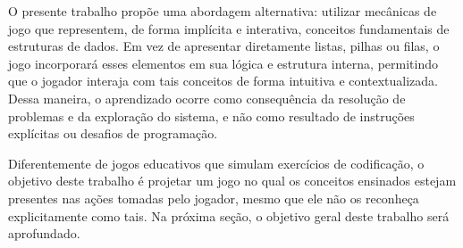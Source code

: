 O presente trabalho propõe uma abordagem alternativa: utilizar mecânicas de
jogo que representem, de forma implícita e interativa, conceitos fundamentais
de estruturas de dados. Em vez de apresentar diretamente listas, pilhas ou
filas, o jogo incorporará esses elementos em sua lógica e estrutura interna,
permitindo que o jogador interaja com tais conceitos de forma intuitiva e
contextualizada. Dessa maneira, o aprendizado ocorre como consequência da
resolução de problemas e da exploração do sistema, e não como resultado de
instruções explícitas ou desafios de programação.

Diferentemente de jogos educativos que simulam exercícios de codificação, o
objetivo deste trabalho é projetar um jogo no qual os conceitos ensinados
estejam presentes nas ações tomadas pelo jogador, mesmo que ele não os
reconheça explicitamente como tais. Na próxima seção, o objetivo geral deste
trabalho será aprofundado.
